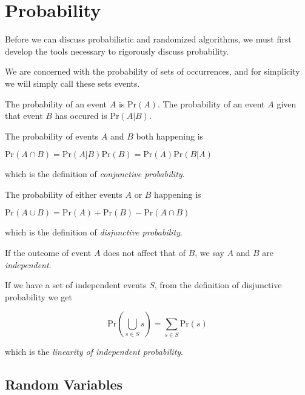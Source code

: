 \renewcommand{\Pr}{\text{Pr}}
\newcommand{\Var}{\text{Var}}

\chapter{Probability}

Before we can discuss probabilistic and randomized algorithms, we must
first develop the tools necessary to rigorously discuss probability.

We are concerned with the probability of sets of occurrences, and for
simplicity we will simply call these sets events.

The probability of an event $A$ is $\Pr(A)$.  The probability of an
event $A$ given that event $B$ has occured is $\Pr(A | B)$.

The probability of events $A$ and $B$ both happening is

\begin{center}
\begin{math}
\Pr(A \cap B)
= \Pr(A|B)\Pr(B) = \Pr(A)\Pr(B|A)
\end{math}
\end{center}

which is the definition of \emph{conjunctive probability}.

The probability of either events $A$ or $B$ happening is

\begin{center}
\begin{math}
  \Pr(A \cup B)
  = \Pr(A) + \Pr(B) - \Pr(A \cap B)
\end{math}
\end{center}

which is the definition of \emph{disjunctive probability}.

If the outcome of event $A$ does not affect that of $B$, we say $A$
and $B$ are \emph{independent}.

If we have a set of independent events $S$, from the definition of
disjunctive probability we get

\begin{displaymath}
  \Pr \left( \bigcup_{s \in S} s \right) = \sum_{s \in S} \Pr(s)
\end{displaymath}

which is the \emph{linearity of independent probability}.

\section{Random Variables}

